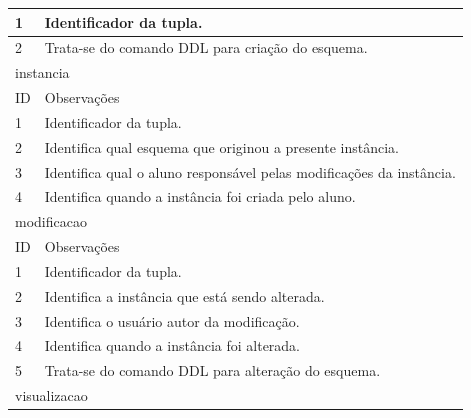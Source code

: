 \documentclass[graduacao,brazil]{ThesisPUC}
\begin{document}
\begin{table}[H]
{\begin{tabular}{|l|l|}
    1                       & Identificador da tupla.                                                                               \\ \hline
    2                       & Trata-se do comando DDL para criação do esquema.                                                      \\ \hline
    \multicolumn{2}{|l|}{instancia} \\ \hline
    ID                      & Observações                                                                                           \\ \hline
    1                       & Identificador da tupla.                                                                               \\ \hline
    2                       & Identifica qual esquema que originou a presente instância.                                            \\ \hline
    3                       & Identifica qual o aluno responsável pelas modificações da instância.                                  \\ \hline
    4                       & Identifica quando a instância foi criada pelo aluno.                                                  \\ \hline
    \multicolumn{2}{|l|}{modificacao} \\ \hline
    ID                      & Observações                                                                                           \\ \hline
    1                       & Identificador da tupla.                                                                               \\ \hline
    2                       & Identifica a instância que está sendo alterada.                                                       \\ \hline
    3                       & Identifica o usuário autor da modificação.                                                            \\ \hline
    4                       & Identifica quando a instância foi alterada.                                                           \\ \hline
    5                       & Trata-se do comando DDL para alteração do esquema.                                                    \\ \hline
    \multicolumn{2}{|l|}{visualizacao} \\ \hline

\end{tabular}}
\end{table}
\end{document}
